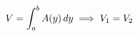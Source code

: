 \documentclass[preview]{standalone}
\begin{document}
\begin{align*}
\special{dvisvgm:raw <g id='unique000'>}V = \int_a^b A(y)\,dy \;\Longrightarrow\; V_1 = V_2\special{dvisvgm:raw </g>}
\end{align*}
\end{document}
